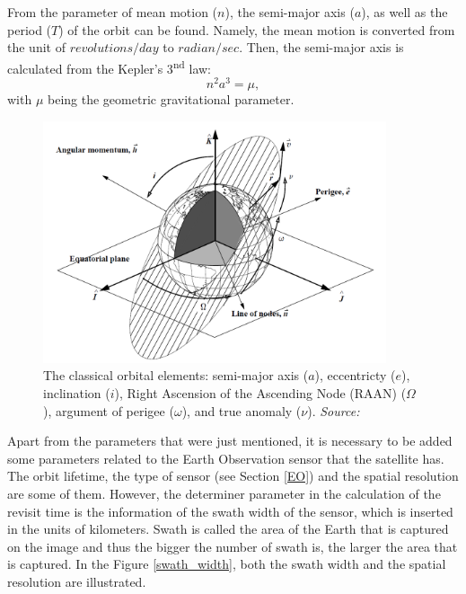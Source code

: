 From the parameter of mean motion ($n$), the semi-major axis ($a$), as well as the period ($T$) of the orbit can be found. Namely, the mean motion is converted from the unit of $revolutions/day$ to $radian/sec$. Then, the semi-major axis is calculated from the Kepler's 3\textsuperscript{nd} law:
\begin{equation}
\label{3rd_keplers_law}
n^2 a^3 = \mu,
\end{equation}
with $\mu$ being the geometric gravitational parameter.

\begin{figure}
\centering
\includegraphics[width=0.9\textwidth]{Images/keplerian_elements.png}\caption{The classical orbital elements: semi-major axis ($a$), eccentricty ($e$), inclination ($i$), Right Ascension of the Ascending Node (RAAN) ($\Omega$), argument of perigee ($\omega$), and true anomaly ($\nu$). \textit{Source: \cite{Vallado}}}
\label{keplerian_elements} 
\end{figure}

Apart from the parameters that were just mentioned, it is necessary to be added some parameters related to the Earth Observation sensor that the satellite has. The orbit lifetime, the type of sensor (see Section \ref{EO}) and the spatial resolution are some of them. However, the determiner parameter in the calculation of the revisit time is the information of the swath width of the sensor, which is inserted in the units of kilometers. Swath is called the area of the Earth that is captured on the image and thus the bigger the number of swath is, the larger the area that is captured. In the Figure \ref{swath_width}, both the swath width and the spatial resolution are illustrated.

